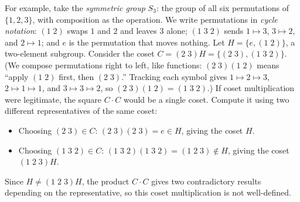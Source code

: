 \begin{itemize}
  For example, take the \emph{symmetric group} $S_3$: the group of all six permutations of $\{1, 2, 3\}$, with composition as the operation. We write permutations in \emph{cycle notation}: $(1\;2)$ swaps $1$ and $2$ and leaves $3$ alone; $(1\;3\;2)$ sends $1 \mapsto 3$, $3 \mapsto 2$, and $2 \mapsto 1$; and $e$ is the permutation that moves nothing. Let $H = \{e, (1\;2)\}$, a two-element subgroup. Consider the coset $C = (2\;3)H = \{(2\;3), (1\;3\;2)\}$. (We compose permutations right to left, like functions: $(2\;3)(1\;2)$ means ``apply $(1\;2)$ first, then $(2\;3)$.'' Tracking each symbol gives $1 \mapsto 2 \mapsto 3$, $2 \mapsto 1 \mapsto 1$, and $3 \mapsto 3 \mapsto 2$, so $(2\;3)(1\;2) = (1\;3\;2)$.) If coset multiplication were legitimate, the square $C \cdot C$ would be a single coset. Compute it using two different representatives of the same coset:
  \begin{itemize}
    \item Choosing $(2\;3) \in C$: $(2\;3)(2\;3) = e \in H$, giving the coset $H$.
    \item Choosing $(1\;3\;2) \in C$: $(1\;3\;2)(1\;3\;2) = (1\;2\;3) \notin H$, giving the coset $(1\;2\;3)H$.
  \end{itemize}
  Since $H \neq (1\;2\;3)H$, the product $C \cdot C$ gives two contradictory results depending on the representative, so this coset multiplication is not well-defined.
\end{itemize}

